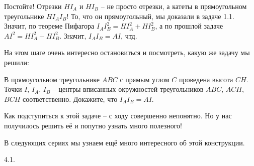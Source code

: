 Постойте! Отрезки $HI_A$ и $HI_B$ -- не просто отрезки, а катеты в прямоугольном треугольнике $HI_AI_B$! То, что он прямоугольный, мы доказали в задаче 1.1. Значит, по теореме Пифагора $I_AI_B^2 = HI_A^2 + HI_B^2$, а по прошлой задаче $AI^2 = HI_A^2 + HI_B^2$. Значит, $I_AI_B = AI$, чтд.

На этом шаге очень интересно остановиться и посмотреть, какую же задачу мы решили:

В прямоугольном треугольнике $ABC$ с прямым углом $C$ проведена высота $CH$. Точки $I$, $I_A$, $I_B$ -- центры вписанных окружностей треугольников $ABC$, $ACH$, $BCH$ соответственно. Докажите, что $I_AI_B = AI$.

Как подступиться к этой задаче -- с ходу совершенно непонятно. Но у нас получилось решить её и попутно узнать много полезного!

В следующих сериях мы узнаем ещё много интересного об этой конструкции.

4.1. 
